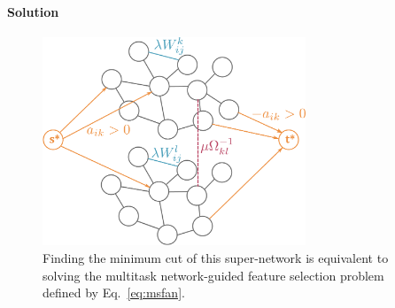 \documentclass[12pt,a4paper]{article}
\begin{document}
\paragraph{Solution}




\begin{figure}[h]
  \centering
  \includegraphics[width=0.7\textwidth]{figures/mincut_msfan}
  \caption{Finding the minimum cut of this super-network is equivalent to solving the multitask network-guided feature selection problem defined by Eq.~\ref{eq:msfan}.}
  \label{fig:mincut_msfan}
\end{figure}
\end{document}
